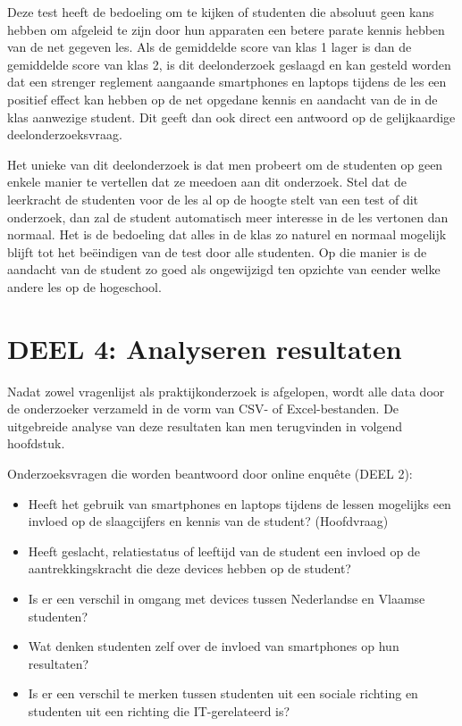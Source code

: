 Deze test heeft de bedoeling om te kijken of studenten die absoluut geen kans hebben om afgeleid te zijn door hun apparaten een betere parate kennis hebben van de net gegeven les. Als de gemiddelde score van klas 1 lager is dan de gemiddelde score van klas 2, is dit deelonderzoek geslaagd en kan gesteld worden dat een strenger reglement aangaande smartphones en laptops tijdens de les een positief effect kan hebben op de net opgedane kennis en aandacht van de in de klas aanwezige student. Dit geeft dan ook direct een antwoord op de gelijkaardige deelonderzoeksvraag.

Het unieke van dit deelonderzoek is dat men probeert om de studenten op geen enkele manier te vertellen dat ze meedoen aan dit onderzoek. Stel dat de leerkracht de studenten voor de les al op de hoogte stelt van een test of dit onderzoek, dan zal de student automatisch meer interesse in de les vertonen dan normaal. Het is de bedoeling dat alles in de klas zo naturel en normaal mogelijk blijft tot het beëindigen van de test door alle studenten. Op die manier is de aandacht van de student zo goed als ongewijzigd ten opzichte van eender welke andere les op de hogeschool. 

\section{DEEL 4: Analyseren resultaten}
\label{sec:analyse}

Nadat zowel vragenlijst als praktijkonderzoek is afgelopen, wordt alle data door de onderzoeker verzameld in de vorm van CSV- of Excel-bestanden. De uitgebreide analyse van deze resultaten kan men terugvinden in volgend hoofdstuk.

Onderzoeksvragen die worden beantwoord door online enquête (DEEL 2):
\begin{itemize}
	\item Heeft het gebruik van smartphones en laptops tijdens de lessen mogelijks een invloed op de slaagcijfers en kennis van de student? (Hoofdvraag)
	\item Heeft geslacht, relatiestatus of leeftijd van de student een invloed op de aantrekkingskracht die deze devices hebben op de student?
	\item Is er een verschil in omgang met devices tussen Nederlandse en Vlaamse studenten?
	\item Wat denken studenten zelf over de invloed van smartphones op hun resultaten?
	\item Is er een verschil te merken tussen studenten uit een sociale richting en studenten uit een richting die IT-gerelateerd is?
\end{itemize}

